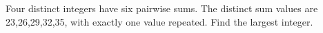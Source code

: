 Four distinct integers have six pairwise sums. The distinct sum values are 23,26,29,32,35, with exactly one value repeated. Find the largest integer.
